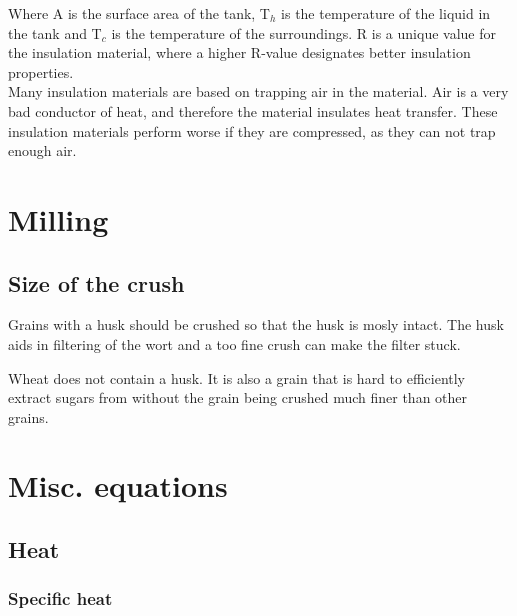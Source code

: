 \documentclass[11pt,fleqn,openany]{book} %
\begin{document}
Where A is the surface area of the tank, T$_h$ is the temperature of the liquid in the tank and T$_c$ is the temperature of the surroundings. R is a unique value for the insulation material, where a higher R-value designates better insulation properties.\\

Many insulation materials are based on trapping air in the material. Air is a very bad conductor of heat, and therefore the material insulates heat transfer. These insulation materials perform worse if they are compressed, as they can not trap enough air.




\chapter{Milling}

\section{Size of the crush}

Grains with a husk should be crushed so that the husk is mosly intact. The husk aids in filtering of the wort and a too fine crush can make the filter stuck.

Wheat does not contain a husk. It is also a grain that is hard to efficiently extract sugars from without the grain being crushed much finer than other grains.



\chapter{Misc. equations}

\section{Heat}



\subsection{Specific heat}
\end{document}
